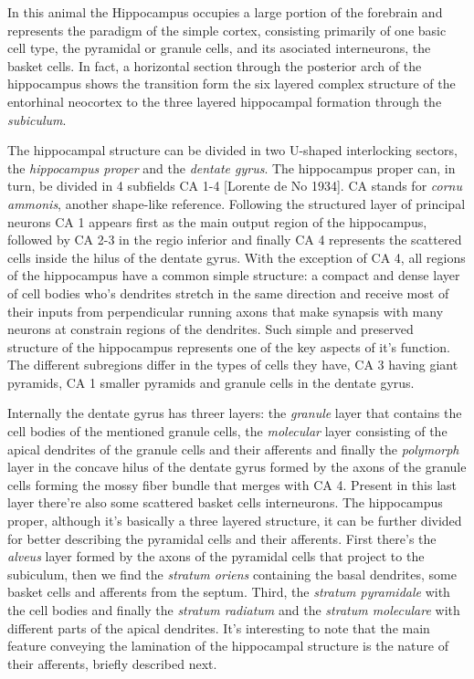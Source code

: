 In this animal the Hippocampus occupies a large portion of the forebrain and represents the paradigm of the simple cortex, consisting primarily of one basic cell type, the pyramidal or granule cells, and its asociated interneurons, the basket cells. 
In fact, a horizontal section through the posterior arch of the hippocampus shows the transition form the six layered complex structure of the entorhinal neocortex to the three layered hippocampal formation through the \textit{subiculum}.

The hippocampal structure can be divided in two U-shaped interlocking sectors, the \textit{hippocampus proper} and the \textit{dentate gyrus}. 
The hippocampus proper can, in turn, be divided in 4 subfields CA 1-4 [Lorente de No 1934]. CA stands for \textit{cornu ammonis}, another shape-like reference. 
Following the structured layer of principal neurons CA 1 appears first as the main output region of the hippocampus, followed by CA 2-3 in the regio inferior and finally CA 4 represents the scattered cells inside the hilus of the dentate gyrus. 
With the exception of CA 4, all regions of the hippocampus have a common simple structure: a compact and dense layer of cell bodies who's dendrites stretch in the same direction and receive most of their inputs from perpendicular running axons that make synapsis with many neurons at constrain regions of the dendrites. 
Such simple and preserved structure of the hippocampus represents one of the key aspects of it's function. 
The different subregions differ in the types of cells they have, CA 3 having giant pyramids, CA 1 smaller pyramids and granule cells in the dentate gyrus. 

Internally the dentate gyrus has threer layers: the \textit{granule} layer that contains the cell bodies of the mentioned granule cells, the \textit{molecular} layer consisting of the apical dendrites of the granule cells and their afferents and finally the \textit{polymorph} layer in the concave hilus of the dentate gyrus formed by the axons of the granule cells forming the mossy fiber bundle that merges with CA 4. Present in this last layer there're also some scattered basket cells interneurons.
The hippocampus proper, although it's basically a three layered structure, it can be further divided for better describing the pyramidal cells and their afferents.
First there's the \textit{alveus} layer formed by the axons of the pyramidal cells that project to the subiculum, then we find the \textit{stratum oriens} containing the basal dendrites, some basket cells and afferents from the septum.
Third, the \textit{stratum pyramidale} with the cell bodies and finally the \textit{stratum radiatum} and the \textit{stratum moleculare} with different parts of the apical dendrites.
It's interesting to note that the main feature conveying the lamination of the hippocampal structure is the nature of their afferents, briefly described next.

